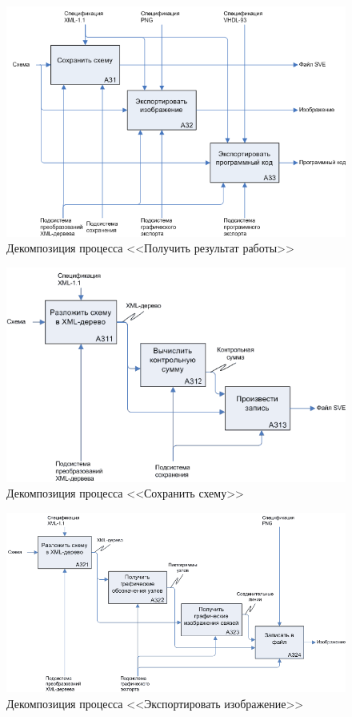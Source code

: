 \begin{figure}[H]
  \centering
  \includegraphics[width=1.0\textwidth]{diagrams/idef/a3-b.png}
  \caption{Декомпозиция процесса <<Получить результат работы>>}
\end{figure}

\begin{figure}[H]
  \centering
  \includegraphics[width=1.0\textwidth]{diagrams/idef/a31-b.png}
  \caption{Декомпозиция процесса <<Сохранить схему>>}
  \label{fig:save-scheme}
\end{figure}

\begin{figure}[H]
  \centering
  \includegraphics[width=1.0\textwidth]{diagrams/idef/a32-b.png}
  \caption{Декомпозиция процесса <<Экспортировать изображение>>}
\end{figure}

